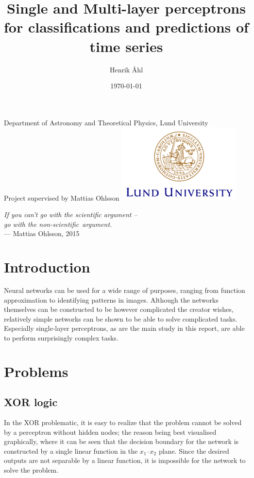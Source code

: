 \documentclass[a4paper,12pt]{article}
\title
{
	\textbf
	{
      Single and Multi-layer perceptrons for classifications and predictions of
      time series
   }
}
\author{Henrik Åhl\\}
\date{\today}
\theoremstyle{plain}
\theoremstyle{definition}
\begin{document}
\begin{titlepage}
	
   \maketitle 
	\begin{center}
		\phantom{a}
		{Department of Astronomy and Theoretical Physics, Lund University}
		\\[2cm]
		{Project supervised by Mattias Ohlsson}
		\vfill
		\includegraphics[height=4cm]{logocLUeng.pdf}
	\end{center}
	\thispagestyle{empty} %

\end{titlepage}

\vspace{5cm}
\noindent\textit{If you can't go with the scientific argument -- \\go with the
non-scientific~argument.}\\ --- Mattias Ohlsson, 2015
\newpage

\section{Introduction}
   Neural networks can be used for a wide range of purposes, ranging from
   function approximation to identifying patterns in images. Although the
   networks themselves can be constructed to be however complicated the creator
   wishes, relatively simple networks can be shown to be able to solve
   complicated tasks. Especially single-layer perceptrons, as are the main study in
   this report, are able to perform surprisingly complex tasks.

\section{Problems}
	\setcounter{equation}{0}
   \subsection{XOR logic}
      In the XOR problematic, it is easy to realize that the problem cannot be
      solved by a perceptron without hidden nodes; the reason being best
      visualised graphically, where it can be seen that the decision boundary
      for the network is constructed by a single linear function in the
      $x_1$--$x_2$ plane. Since the desired outputs are not separable by a linear
      function, it is impossible for the network to solve the problem. 
\end{document}

